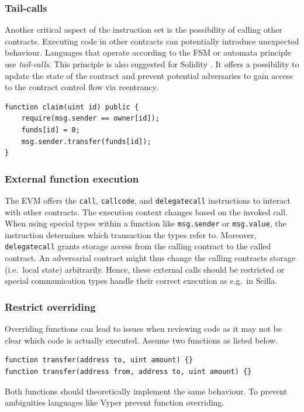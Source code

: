 \subsubsection{Tail-calls}
Another critical aspect of the instruction set is the possibility of calling other contracts. Executing code in other contracts can potentially introduce unexpected behaviour. Languages that operate according to the FSM or automata principle use \emph{tail-calls}. This principle is also suggested for Solidity \cite{ConsenSys2018Security}.
It offers a possibility to update the state of the contract and prevent potential adversaries to gain access to the contract control flow via reentrancy.

\begin{lstlisting}[caption={Tail calls implemented in Solidity.},label=lst:tail-call,language=Solidity]
function claim(uint id) public {
	require(msg.sender == owner[id]);
	funds[id] = 0;
	msg.sender.transfer(funds[id]);
}
\end{lstlisting}

\subsubsection{External function execution}
The EVM offers the \texttt{call}, \texttt{callcode}, and \texttt{delegatecall} instructions to interact with other contracts. The execution context changes based on the invoked call. When using special types within a function like \texttt{msg.sender} or \texttt{msg.value}, the instruction determines which transaction the types refer to. Moreover, \texttt{delegatecall} grants storage access from the calling contract to the called contract. An adversarial contract might thus change the calling contracts storage (i.e.\ local state) arbitrarily. Hence, these external calls should be restricted or special communication types handle their correct execution as e.g.\ in Scilla.



\subsubsection{Restrict overriding}
Overriding functions can lead to issues when reviewing code as it may not be clear which code is actually executed. Assume two functions as listed below.
\begin{lstlisting}[caption={Function overriding with different inputs.},label=lst:tail-call,language=Solidity]
function transfer(address to, uint amount) {}
function transfer(address from, address to, uint amount) {}
\end{lstlisting}
Both functions should theoretically implement the same behaviour. To prevent ambiguities languages like Vyper prevent function overriding.

